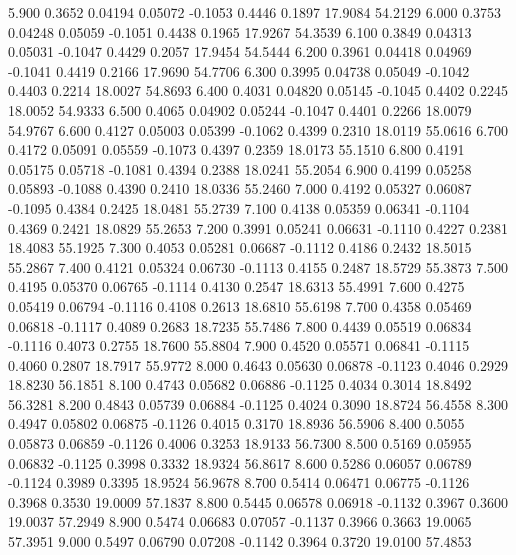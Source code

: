    5.900   0.3652   0.04194   0.05072  -0.1053   0.4446   0.1897  17.9084  54.2129
   6.000   0.3753   0.04248   0.05059  -0.1051   0.4438   0.1965  17.9267  54.3539
   6.100   0.3849   0.04313   0.05031  -0.1047   0.4429   0.2057  17.9454  54.5444
   6.200   0.3961   0.04418   0.04969  -0.1041   0.4419   0.2166  17.9690  54.7706
   6.300   0.3995   0.04738   0.05049  -0.1042   0.4403   0.2214  18.0027  54.8693
   6.400   0.4031   0.04820   0.05145  -0.1045   0.4402   0.2245  18.0052  54.9333
   6.500   0.4065   0.04902   0.05244  -0.1047   0.4401   0.2266  18.0079  54.9767
   6.600   0.4127   0.05003   0.05399  -0.1062   0.4399   0.2310  18.0119  55.0616
   6.700   0.4172   0.05091   0.05559  -0.1073   0.4397   0.2359  18.0173  55.1510
   6.800   0.4191   0.05175   0.05718  -0.1081   0.4394   0.2388  18.0241  55.2054
   6.900   0.4199   0.05258   0.05893  -0.1088   0.4390   0.2410  18.0336  55.2460
   7.000   0.4192   0.05327   0.06087  -0.1095   0.4384   0.2425  18.0481  55.2739
   7.100   0.4138   0.05359   0.06341  -0.1104   0.4369   0.2421  18.0829  55.2653
   7.200   0.3991   0.05241   0.06631  -0.1110   0.4227   0.2381  18.4083  55.1925
   7.300   0.4053   0.05281   0.06687  -0.1112   0.4186   0.2432  18.5015  55.2867
   7.400   0.4121   0.05324   0.06730  -0.1113   0.4155   0.2487  18.5729  55.3873
   7.500   0.4195   0.05370   0.06765  -0.1114   0.4130   0.2547  18.6313  55.4991
   7.600   0.4275   0.05419   0.06794  -0.1116   0.4108   0.2613  18.6810  55.6198
   7.700   0.4358   0.05469   0.06818  -0.1117   0.4089   0.2683  18.7235  55.7486
   7.800   0.4439   0.05519   0.06834  -0.1116   0.4073   0.2755  18.7600  55.8804
   7.900   0.4520   0.05571   0.06841  -0.1115   0.4060   0.2807  18.7917  55.9772
   8.000   0.4643   0.05630   0.06878  -0.1123   0.4046   0.2929  18.8230  56.1851
   8.100   0.4743   0.05682   0.06886  -0.1125   0.4034   0.3014  18.8492  56.3281
   8.200   0.4843   0.05739   0.06884  -0.1125   0.4024   0.3090  18.8724  56.4558
   8.300   0.4947   0.05802   0.06875  -0.1126   0.4015   0.3170  18.8936  56.5906
   8.400   0.5055   0.05873   0.06859  -0.1126   0.4006   0.3253  18.9133  56.7300
   8.500   0.5169   0.05955   0.06832  -0.1125   0.3998   0.3332  18.9324  56.8617
   8.600   0.5286   0.06057   0.06789  -0.1124   0.3989   0.3395  18.9524  56.9678
   8.700   0.5414   0.06471   0.06775  -0.1126   0.3968   0.3530  19.0009  57.1837
   8.800   0.5445   0.06578   0.06918  -0.1132   0.3967   0.3600  19.0037  57.2949
   8.900   0.5474   0.06683   0.07057  -0.1137   0.3966   0.3663  19.0065  57.3951
   9.000   0.5497   0.06790   0.07208  -0.1142   0.3964   0.3720  19.0100  57.4853
